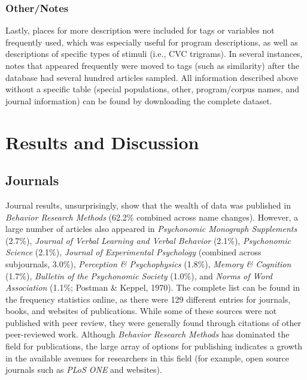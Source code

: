 \documentclass[english,man]{apa6}
\theoremstyle{definition}
\theoremstyle{definition}
\theoremstyle{definition}
\theoremstyle{remark}
\begin{document}
\subsubsection{Other/Notes}\label{othernotes}

Lastly, places for more description were included for tags or variables
not frequently used, which was especially useful for program
descriptions, as well as descriptions of specific types of stimuli
(i.e., CVC trigrams). In several instances, notes that appeared
frequently were moved to tags (such as similarity) after the database
had several hundred articles sampled. All information described above
without a specific table (special populations, other, program/corpus
names, and journal information) can be found by downloading the complete
dataset.

\section{Results and Discussion}\label{results-and-discussion}

\subsection{Journals}\label{journals}

Journal results, unsurprisingly, show that the wealth of data was
published in \emph{Behavior Research Methods} (62.2\% combined across
name changes). However, a large number of articles also appeared in
\emph{Psychonomic Monograph Supplements} (2.7\%), \emph{Journal of
Verbal Learning and Verbal Behavior} (2.1\%), \emph{Psychonomic Science}
(2.1\%), \emph{Journal of Experimental Psychology} (combined across
subjournals, 3.0\%), \emph{Perception \& Psychophysics} (1.8\%),
\emph{Memory \& Cognition} (1.7\%), \emph{Bulletin of the Psychonomic
Society} (1.0\%), and \emph{Norms of Word Association} (1.1\%; Postman
\& Keppel, 1970). The complete list can be found in the frequency
statistics online, as there were 129 different entries for journals,
books, and websites of publications. While some of these sources were
not published with peer review, they were generally found through
citations of other peer-reviewed work. Although \emph{Behavior Research
Methods} has dominated the field for publications, the large array of
options for publishing indicates a growth in the available avenues for
researchers in this field (for example, open source journals such as
\emph{PLoS ONE} and websites).
\end{document}
